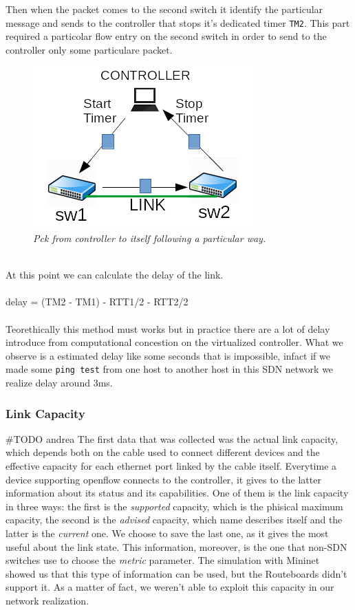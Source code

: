 \documentclass[article,10pt]{IEEEtran}
\begin{document}
Then when the packet comes to the second switch it identify the particular message and sends to the controller that stops it's dedicated timer \texttt{TM2}.
\newline This part required a particolar flow entry on the second switch in order to send to the controller only some particulare packet.
\begin{figure}[!h]
 \centering
 \includegraphics[scale=0.70]{images/rtt1.png}
 \caption{\emph{Pck from controller to itself following a particular way.}}
 \label{fig:topo}
\end{figure}
\\
\newline At this point we can calculate the delay of the link.
\\
\\
 delay = (TM2 - TM1) - RTT1/2 - RTT2/2
\\
\\
Teorethically this method must works but in practice there are a lot of delay introduce from computational concestion on the virtualized controller.
What we observe is a estimated delay like some seconds that is impossible, infact if we made some \texttt{ping test} from one host to another host
in this SDN network we realize delay around 3ms.
\\

		\subsubsection{Link Capacity}

	\#TODO andrea
	The first data that was collected was the actual link capacity, which depends both on the cable used to connect
	different devices and the effective capacity for each ethernet port linked by the cable itself. Everytime a device supporting
	openflow connects to the controller, it gives to the latter information about its status and its capabilities. One of them is
	the link capacity in three ways: the first is the \textit{supported} capacity, which is the phisical maximum capacity, the second is the
	\textit{advised} capacity, which name describes itself and the latter is the \textit{current} one. We choose to save the last one,
	as it gives the most useful about the link state. This information, moreover, is the one that non-SDN switches use to choose the \textit{metric}
	parameter. The simulation with Mininet showed us that this type of information can be used, but the Routeboards didn't support it.
	As a matter of fact, we weren't able to exploit this capacity in our network realization.
		\\
		\\
\end{document}
